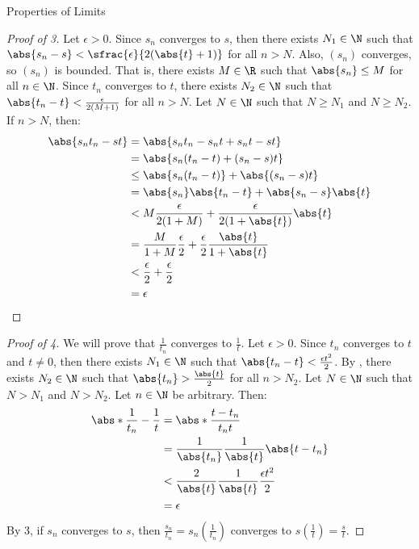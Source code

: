 \begin{thmbox}{Properties of Limits}{}
    \begin{proof}[Proof of 3]
        Let $\epsilon > 0$. Since $s_n$ converges to $s$, then there exists $N_1 \in \N$ such that $\abs{s_n - s} < \sfrac{\epsilon}{2(\abs{t} + 1)}$ for all $n > N$. Also, $(s_n)$ converges, so $(s_n)$ is bounded. That is, there exists $M \in \R$ such that $\abs{s_n} \leq M$ for all $n \in \N$. Since $t_n$ converges to $t$, there exists $N_2 \in \N$ such that $\abs{t_n - t} < \frac{\epsilon}{2(M+1)}$ for all $n > N$. Let $N \in \N$ such that $N \geq N_1$ and $N \geq N_2$. If $n > N$, then:
        \begin{align*}
            \abs{s_nt_n - st}
            &= \abs{s_nt_n - s_nt + s_nt - st} \\
            &= \abs{s_n(t_n-t) + (s_n-s)t} \\
            &\leq \abs{s_n(t_n-t)} + \abs{(s_n-s)t} \\
            &= \abs{s_n} \abs{t_n-t} + \abs{s_n-s}\abs{t} \\
            &< M \frac{\epsilon}{2(1+M)} + \frac{\epsilon}{2(1+\abs{t})} \abs{t} \\
            &= \frac{M}{1+M} \frac{\epsilon}{2} + \frac{\epsilon}{2} \frac{\abs{t}}{1 + \abs{t}} \\
            &< \frac{\epsilon}{2} + \frac{\epsilon}{2} \\
            &= \epsilon
        \end{align*}
    \end{proof}

    \begin{proof}[Proof of 4]
        We will prove that $\frac{1}{t_n}$ converges to $\frac{1}{t}$. Let $\epsilon > 0$. Since $t_n$ converges to $t$ and $t \neq 0$, then there exists $N_1 \in \N$ such that $\abs{t_n - t} < \frac{\epsilon t^2}{2}$. By , there exists $N_2 \in \N$ such that $\abs{t_n} > \frac{\abs{t}}{2}$ for all $n > N_2$. Let $N \in \N$ such that $N > N_1$ and $N > N_2$. Let $n \in \N$ be arbitrary. Then:
        \begin{align*}
            \abs*{\frac{1}{t_n} - \frac{1}{t}} &= \abs*{\frac{t-t_n}{t_nt}} \\
            &= \frac{1}{\abs{t_n}} \frac{1}{\abs{t}} \abs{t-t_n} \\
            &< \frac{2}{\abs{t}} \frac{1}{\abs{t}} \frac{\epsilon t^2}{2} \\
            &= \epsilon
        \end{align*}
        By 3, if $s_n$ converges to $s$, then $\frac{s_n}{t_n} = s_n \left( \frac{1}{t_n} \right) $ converges to $s \left( \frac{1}{t} \right) = \frac{s}{t}$.
    \end{proof}
\end{thmbox}

